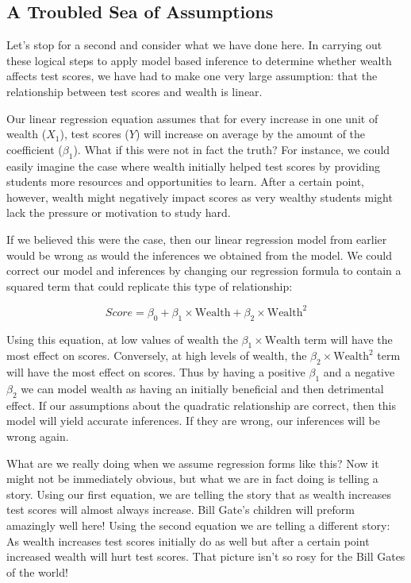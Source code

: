 \documentclass[]{memoir}
\begin{document}
\subsection{A Troubled Sea of Assumptions}

Let's stop for a second and consider what we have done here. In carrying
out these logical steps to apply model based inference to determine
whether wealth affects test scores, we have had to make one very large
assumption: that the relationship between test scores and wealth is
linear.

Our linear regression equation assumes that for every increase in one
unit of wealth ($X_1$), test scores ($Y$) will increase on average by
the amount of the coefficient ($\beta_1$). What if this were not in fact
the truth? For instance, we could easily imagine the case where wealth
initially helped test scores by providing students more resources and
opportunities to learn. After a certain point, however, wealth might
negatively impact scores as very wealthy students might lack the
pressure or motivation to study hard.

If we believed this were the case, then our linear regression model from
earlier would be wrong as would the inferences we obtained from the
model. We could correct our model and inferences by changing our
regression formula to contain a squared term that could replicate this
type of relationship:

\[ Score = \beta_0 + \beta_1 \times \text{Wealth} + \beta_2 \times \text{Wealth}^2 \]

Using this equation, at low values of wealth the
$\beta_1 \times \text{Wealth}$ term will have the most effect on scores.
Conversely, at high levels of wealth, the
$\beta_2 \times \text{Wealth}^2$ term will have the most effect on
scores. Thus by having a positive $\beta_1$ and a negative $\beta_2$ we
can model wealth as having an initially beneficial and then detrimental
effect. If our assumptions about the quadratic relationship are correct,
then this model will yield accurate inferences. If they are wrong, our
inferences will be wrong again.

What are we really doing when we assume regression forms like this? Now
it might not be immediately obvious, but what we are in fact doing is
telling a story. Using our first equation, we are telling the story that
as wealth increases test scores will almost always increase. Bill Gate's
children will preform amazingly well here! Using the second equation we
are telling a different story: As wealth increases test scores initially
do as well but after a certain point increased wealth will hurt test
scores. That picture isn't so rosy for the Bill Gates of the world!
\end{document}
